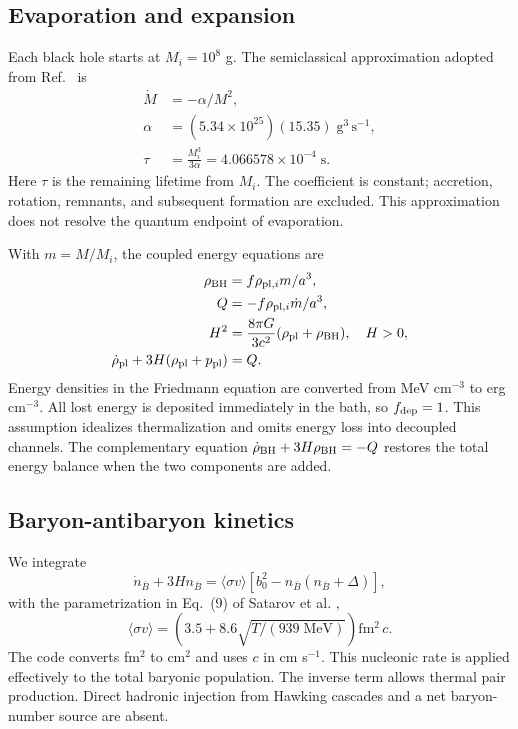\documentclass[10pt,a4paper,twocolumn]{article}
\newcommand{\nb}{{n_{\bar B}}}
\begin{document}
\subsection{Evaporation and expansion}
Each black hole starts at $M_i=10^8$ g. The semiclassical approximation adopted from Ref.~\cite{cai} is
\begin{align}
\dot M&=-\alpha/M^2,\\
\alpha&=(5.34\times10^{25})(15.35)\;\mathrm{g^3\,s^{-1}},\\
\tau&=\frac{M_i^3}{3\alpha}=4.066578\times10^{-4}\;\mathrm{s}.
\end{align}
Here $\tau$ is the remaining lifetime from $M_i$. The coefficient is constant; accretion, rotation, remnants, and subsequent formation are excluded. This approximation does not resolve the quantum endpoint of evaporation.

With $m=M/M_i$, the coupled energy equations are
\begin{align}
\rho_{\rm BH}&=f\rho_{{\rm pl},i}m/a^3,\\
Q&=-f\rho_{{\rm pl},i}\dot m/a^3,\\
H^2&=\frac{8\pi G}{3c^2}(\rho_{\rm pl}+\rho_{\rm BH}),\quad H>0,\\
\dot\rho_{\rm pl}+3H(\rho_{\rm pl}+p_{\rm pl})&=Q.
\end{align}
Energy densities in the Friedmann equation are converted from MeV cm$^{-3}$ to erg cm$^{-3}$. All lost energy is deposited immediately in the bath, so $f_{\rm dep}=1$. This assumption idealizes thermalization and omits energy loss into decoupled channels. The complementary equation $\dot\rho_{\rm BH}+3H\rho_{\rm BH}=-Q$ restores the total energy balance when the two components are added.

\subsection{Baryon-antibaryon kinetics}
We integrate
\begin{equation}
\dot n_{\bar B}+3H\nb=\langle\sigma v\rangle\left[b_0^2-\nb(\nb+\Delta)\right],
\end{equation}
with the parametrization in Eq.~(9) of Satarov et al. \cite{satarov},
\begin{equation}
\langle\sigma v\rangle=\left(3.5+8.6\sqrt{T/(939\;\mathrm{MeV})}\right)\mathrm{fm^2}\,c.
\end{equation}
The code converts fm$^2$ to cm$^2$ and uses $c$ in cm s$^{-1}$. This nucleonic rate is applied effectively to the total baryonic population. The inverse term allows thermal pair production. Direct hadronic injection from Hawking cascades and a net baryon-number source are absent.
\end{document}
